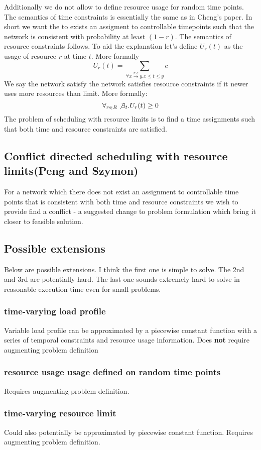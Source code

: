 \documentclass{article}
\begin{document}
\begin{multicols}{2}
Additionally we do not allow to define resource usage for random time points.\\
The semantics of time constraints is essentially the same as in Cheng's paper. In short we want the to exists an assigment to controllable timepoints such that the network is consistent with probability at least $(1-r)$. The semantics of resource constraints follows. To aid the explanation let's define $U_r(t)$ as the usage of resource $r$ at time $t$. More formally
\[
U_r(t) = \sum_{\forall x \xrightarrow{r:c} y. x\leq t \leq y} c
\]
We say the network satisfy the network satisfies resource constraints if it newer uses more resources than limit. More formally:
\[
\forall_{r \in R} \not \exists_{t} . U_r(t) \geq 0
\]
The problem of scheduling with resource limits is to find a time assignments such that both time and resource constraints are satisfied. 
\subsection{Conflict directed scheduling with resource limits(Peng and Szymon)}
For a network which there does not exist an assignment to controllable time points that is consistent with both time and resource constraints we wish to provide find a conflict - a suggested change to problem formulation which bring it closer to feasible solution.
\subsection{Possible extensions}
Below are possible extensions. I think the first one is simple to solve. The 2nd and 3rd are potentially hard. The last one sounds extremely hard to solve in reasonable execution time even for small problems.
\subsubsection{time-varying load profile}
Variable load profile can be approximated by a piecewise constant function with a series of temporal constraints and resource usage information. Does \textbf{not} require augmenting problem definition
\subsubsection{resource usage usage defined on random time points}
Requires augmenting problem definition. 
\subsubsection{time-varying resource limit}
Could also potentially be approximated by piecewise constant function. Requires augmenting problem definition.

\end{multicols}
\end{document}
